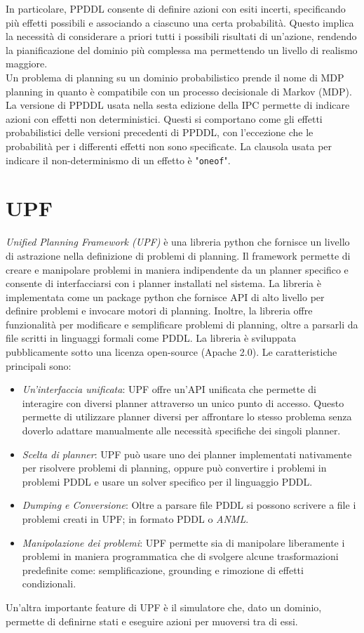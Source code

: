 \documentclass[a4paper, 11pt, titlepage, twoside, openany]{book}
\begin{document}
In particolare, PPDDL consente di definire azioni con esiti incerti, specificando più effetti possibili e associando a ciascuno una certa probabilità. Questo implica la necessità di considerare a priori tutti i possibili risultati di un'azione, rendendo la pianificazione del dominio più complessa ma permettendo un livello di realismo maggiore. \\
Un problema di planning su un dominio probabilistico prende il nome di MDP planning in quanto è compatibile con un processo decisionale di Markov (MDP). \\
La versione di PPDDL usata nella sesta edizione della IPC permette di indicare azioni con effetti non deterministici. Questi si comportano come gli effetti probabilistici delle versioni precedenti di PPDDL, con l'eccezione che le probabilità per i differenti effetti non sono specificate. \cite{PPDDL}
La clausola usata per indicare il non-determinismo di un effetto è "\texttt{oneof}".

\section{UPF} 
\textit{Unified Planning Framework (UPF)}\cite{UPF}\cite{UPF_docs} è una libreria python che fornisce un livello di astrazione nella definizione di problemi di planning. Il framework permette di creare e manipolare problemi in maniera indipendente da un planner specifico e consente di interfacciarsi con i planner installati nel sistema.
La libreria è implementata come un package python che fornisce API di alto livello per definire problemi e invocare motori di planning. Inoltre, la libreria offre funzionalità per modificare e semplificare problemi di planning, oltre a parsarli da file scritti in linguaggi formali come PDDL.
La libreria è sviluppata pubblicamente sotto una licenza open-source (Apache 2.0).
Le caratteristiche principali sono:
\begin{itemize}
    \item \textit{Un'interfaccia unificata}: UPF offre un'API unificata che permette di interagire con diversi planner attraverso un unico punto di accesso. Questo permette di utilizzare planner diversi per affrontare lo stesso problema senza doverlo adattare manualmente alle necessità specifiche dei singoli planner.
    \item \textit{Scelta di planner}: UPF può usare uno dei planner implementati nativamente per risolvere problemi di planning, oppure può convertire i problemi in problemi PDDL e usare un solver specifico per il linguaggio PDDL.
    \item \textit{Dumping e Conversione}: Oltre a parsare file PDDL si possono scrivere a file i problemi creati in UPF; in formato PDDL o \textit{ANML}\cite{ANML}.
    \item \textit{Manipolazione dei problemi}: UPF permette sia di manipolare liberamente i problemi in maniera programmatica che di svolgere alcune trasformazioni predefinite come: semplificazione, grounding e rimozione di effetti condizionali.
\end{itemize}
Un'altra importante feature di UPF è il simulatore che, dato un dominio, permette di definirne stati e eseguire azioni per muoversi tra di essi.
\end{document}
